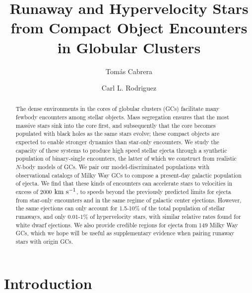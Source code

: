 \documentclass[twocolumn]{aastex631}
\newcommand{\kms}{${\rm km~s^{-1}}$}
\begin{document}
\title{Runaway and Hypervelocity Stars from Compact Object Encounters in Globular Clusters}

\author[0000-0002-1270-7666]{Tom\'as Cabrera}

\author[0000-0003-4175-8881]{Carl L. Rodriguez}

\begin{abstract}
    The dense environments in the cores of globular clusters (GCs) facilitate many fewbody encounters among stellar objects.
 	Mass segregation ensures that the most massive stars sink into the core first, and subsequently that the core becomes populated with black holes as the same stars evolve; these compact objects are expected to enable stronger dynamics than star-only encounters.
 	We study the capacity of these systems to produce high speed stellar ejecta through a synthetic population of binary-single encounters, the latter of which we construct from realistic $N$-body models of GCs.
 	We pair our model-discriminated populations with observational catalogs of Milky Way GCs to compose a present-day galactic population of ejecta.
 	We find that these kinds of encounters can accelerate stars to velocities in excess of 2000 \kms, to speeds beyond the previously predicted limits for ejecta from star-only encounters and in the same regime of galactic center ejections.
	However, the same ejections can only account for 1.5-10\% of the total population of stellar runaways, and only 0.01-1\% of hypervelocity stars, with similar relative rates found for white dwarf ejections.
	We also provide credible regions for ejecta from 149 Milky Way GCs, which we hope will be useful as supplementary evidence when pairing runaway stars with origin GCs.
\end{abstract}

\section{Introduction}
\label{sec:intro}
\end{document}
